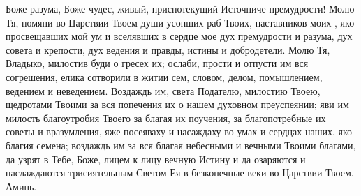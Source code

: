 \mychapterending

\begin{mymulticols}


Боже разума, Боже чудес, живый, приснотекущий Источниче премудрости! Молю Тя, помяни во Царствии Твоем души усопших раб Твоих, наставников моих , яко просвещавших мой ум и вселявших в сердце мое дух премудрости и разума, дух совета и крепости, дух ведения и правды, истины и добродетели. Молю Тя, Владыко, милостив буди о гресех их; ослаби, прости и отпусти им вся согрешения, елика сотворили в житии сем, словом, делом, помышлением, ведением и неведением. Воздаждь им, света Подателю, милостию Твоею, щедротами Твоими за вся попечения их о нашем духовном преуспеянии; яви им милость благоутробия Твоего за благая их поучения, за благопотребные их советы и вразумления, яже посеяваху и насаждаху во умах и сердцах наших, яко благия семена; воздаждь им за вся благая небесными и вечными Твоими благами, да узрят в Тебе, Боже, лицем к лицу вечную Истину и да озаряются и наслаждаются трисиятельным Светом Ея в безконечные веки во Царствии Твоем. Аминь. 

\end{mymulticols}

\mychapterending

